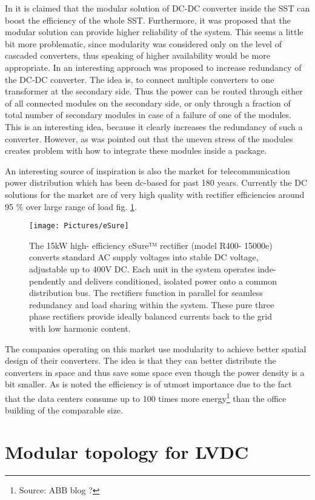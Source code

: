 \documentclass[]{scrartcl}
\begin{document}
%
In \cite{Quartarone} it is claimed that the modular solution of DC-DC converter inside the SST can boost the efficiency of the whole SST. Furthermore, it was proposed that the modular solution can provide higher reliability of the system. This seems a little bit more problematic, since modularity was considered only on the level of cascaded converters, thus speaking of higher availability would be more appropriate. 
%
In \cite{Costa2015} an interesting approach was proposed to increase redundancy of the DC-DC converter. 
The idea is, to connect multiple converters to one transformer at the secondary side. Thus the power can be routed through either of all connected modules on the secondary side, or only through a fraction of total number of secondary modules in case of a failure of  one of the modules. This is an interesting idea, because it clearly increases the redundancy of such a converter. However, as was pointed out that the uneven stress of the modules creates problem with how to integrate these modules inside a package. 
 

An interesting source of inspiration is also the market for telecommunication power  distribution which has been dc-based for past 180 years. Currently the DC solutions for the market are of very high quality with rectifier efficiencies around 95 \% over large range of load fig. \ref{fig:eSure}.
\begin{figure}[h!]
	\centering
	\texttt{[image: Pictures/eSure]}
	\caption{The 15kW high- efficiency eSure™ rectifier (model R400- 15000e) converts standard AC supply voltages into stable DC voltage, adjustable up to 400V DC. Each unit in the system operates inde- pendently and delivers conditioned, isolated power onto a common distribution bus. The rectifiers function in parallel for seamless redundancy and load sharing within the system. These pure three phase rectifiers provide ideally balanced currents back to the grid with low harmonic content.}
	\label{fig:eSure}
\end{figure}
The companies operating on this market use modularity to achieve better spatial design of their converters. The idea is that they can better distribute the converters in space and thus save some space even though the power density is a bit smaller. As is noted the efficiency is of utmost importance due to the fact that the data centers consume up to 100 times more energy\footnote{Source: ABB blog ?} than the office building of the comparable size. 

\newpage
\section{Modular topology for LVDC}
\end{document}
